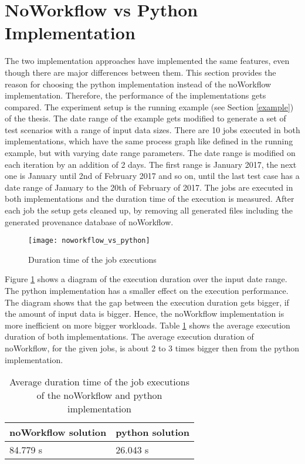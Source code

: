\documentclass[draft,final]{vutinfth} %
\begin{document}
\section{NoWorkflow vs Python Implementation}\label{Evaluation:NvsP}
The two implementation approaches have implemented the same features, even though there are major differences between them. This section provides the reason for choosing the python implementation instead of the noWorkflow implementation. Therefore, the performance of the implementations gets compared. The experiment setup is the running example (see Section \ref{example}) of the thesis. The date range of the example gets modified to generate a set of test scenarios with a range of input data sizes. There are 10 jobs executed in both implementations, which have the same process graph like defined in the running example, but with varying date range parameters. The date range is modified on each iteration by an addition of 2 days. The first range is January 2017, the next one is January until 2nd of February 2017 and so on, until the last test case has a date range of January to the 20th of February of 2017. The jobs are executed in both implementations and the duration time of the execution is measured. After each job the setup gets cleaned up, by removing all generated files including the generated provenance database of noWorkflow. 

\begin{figure}[h]
	\centering
	\texttt{[image: noworkflow\_vs\_python]}
	\caption{Duration time of the job executions}
	\label{fig:noworkvspython} %
\end{figure}

Figure \ref{fig:noworkvspython} shows a diagram of the execution duration over the input date range. The python implementation has a smaller effect on the execution performance. The diagram shows that the gap between the execution duration gets bigger, if the amount of input data is bigger. Hence, the noWorkflow implementation is more inefficient on more bigger workloads. Table \ref{Tab:noworkflow} shows the average execution duration of both implementations. The average execution duration of noWorkflow, for the given jobs, is about 2 to 3 times bigger then from the python implementation.  

\begin{table}[]
	\caption{Average duration time of the job executions of the  noWorkflow and python implementation}
	\centering
	\begin{tabular}{l|l}
		\textbf{noWorkflow solution} & \textbf{python solution} \\ \hline
		84.779 s & 26.043 s \\ 
	\end{tabular}
	\label{Tab:noworkflow}
\end{table}
\end{document}
